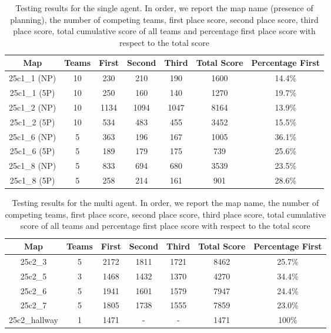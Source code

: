 \begin{table}[H]
    \centering
    \begin{tabular}{|c|c|c|c|c|c|c|}
        \hline
        Map & Teams & First & Second & Third & Total Score & Percentage First \\
        \hline
        25c1\_1 (NP)  & 10   & 230   & 210   & 190  & 1600  & 14.4\% \\
        25c1\_1 (5P)  & 10   & 250   & 160   & 140  & 1270  & 19.7\% \\
        25c1\_2 (NP)  & 10  & 1134  & 1094  & 1047  & 8164  & 13.9\% \\
        25c1\_2 (5P)  & 10   & 534   & 483   & 455  & 3452  & 15.5\% \\
        25c1\_6 (NP)   & 5   & 363   & 196   & 167  & 1005  & 36.1\% \\
        25c1\_6 (5P)   & 5   & 189   & 179   & 175   & 739  & 25.6\% \\
        25c1\_8 (NP)   & 5   & 833   & 694   & 680  & 3539  & 23.5\% \\
        25c1\_8 (5P)   & 5   & 258   & 214   & 161   & 901  & 28.6\% \\
        \hline
    \end{tabular}
    \caption{Testing results for the single agent. In order, we report the map name (presence of planning), the number of competing teams, first place score, second place score, third place score, total cumulative score of all teams and percentage first place score with respect to the total score}
    \label{tab:table_1}
\end{table}

\begin{table}[H]
    \centering
    \begin{tabular}{|c|c|c|c|c|c|c|}
        \hline
        Map & Teams & First & Second & Third & Total Score & Percentage First \\
        \hline
        25c2\_3         & 5  & 2172   & 1811  & 1721  & 8462  & 25.7\% \\
        25c2\_5         & 3  & 1468   & 1432  & 1370  & 4270  & 34.4\% \\
        25c2\_6         & 5  & 1941   & 1601  & 1579  & 7947  & 24.4\% \\
        25c2\_7         & 5  & 1805   & 1738  & 1555  & 7859  & 23.0\% \\
        25c2\_hallway   & 1  & 1471   & -     & -     & 1471   & 100\% \\
        \hline
    \end{tabular}
    \caption{Testing results for the multi agent. In order, we report the map name, the number of competing teams, first place score, second place score, third place score, total cumulative score of all teams and percentage first place score with respect to the total score}
    \label{tab:table_2}
\end{table}